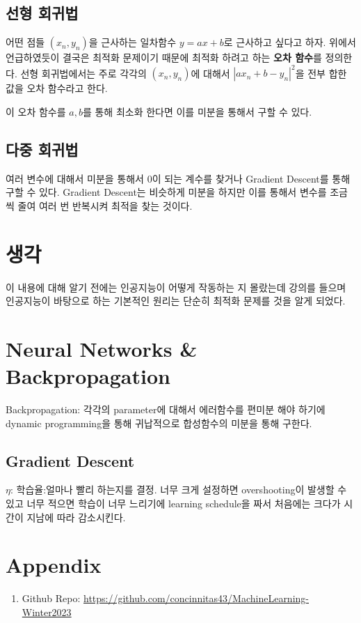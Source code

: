 \documentclass[]{sptr_article}
\begin{document}
\subsection{선형 회귀법}

어떤 점들 $(x_n, y_n)$을 근사하는 일차함수 $y=ax+b$로 근사하고 싶다고 하자. 
위에서 언급하였듯이 결국은 최적화 문제이기 때문에 최적화 하려고 하는 \textbf{오차 함수}를 정의한다. 
선형 회귀법에서는 주로 각각의 $(x_n, y_n)$에 대해서 $|ax_n + b - y_n|^2$을 전부 합한 값을 오차 함수라고 한다.

이 오차 함수를 $a, b$를 통해 최소화 한다면 이를 미분을 통해서 구할 수 있다. 

\subsection{다중 회귀법}

여러 변수에 대해서 미분을 통해서 0이 되는 계수를 찾거나
Gradient Descent를 통해 구할 수 있다.
Gradient Descent는 비슷하게 미분을 하지만 이를 통해서 변수를 조금씩 줄여 여러 번 반복시켜 최적을 찾는 것이다.


\section{생각}

이 내용에 대해 알기 전에는 인공지능이 어떻게 작동하는 지 몰랐는데 강의를 들으며 인공지능이 바탕으로 하는 기본적인 원리는 단순히 최적화 문제를 것을 알게 되었다.

\section{Neural Networks & Backpropagation}

Backpropagation: 각각의 parameter에 대해서 에러함수를 편미분 해야 하기에 dynamic programming을 통해 귀납적으로 합성함수의 미분을 통해 구한다.


\subsection{Gradient Descent}

$\eta$: 학습율:얼마나 빨리 하는지를 결정. 너무 크게 설정하면 overshooting이 발생할 수 있고 너무 적으면 학습이 너무 느리기에 learning schedule을 짜서
처음에는 크다가 시간이 지남에 따라 감소시킨다.


\section*{Appendix}

\begin{enumerate}
  \item Github Repo: \url{https://github.com/concinnitas43/MachineLearning-Winter2023}
\end{enumerate}

\end{document}
